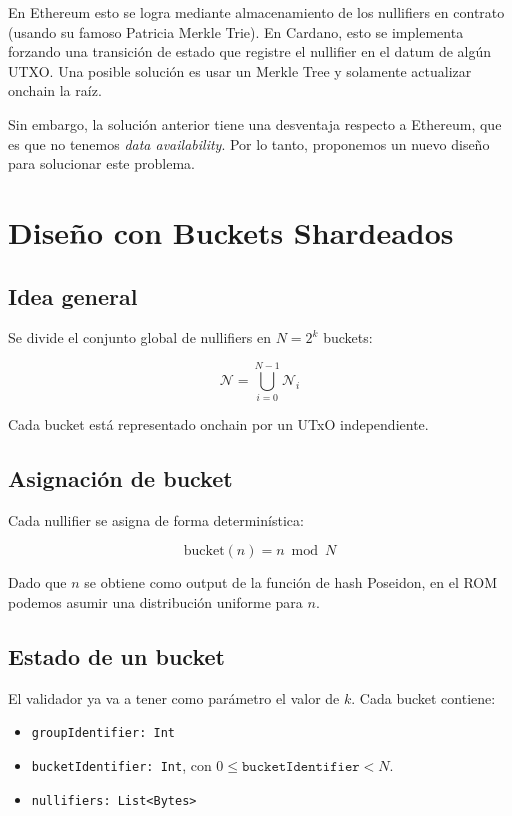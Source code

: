 \documentclass[11pt]{article}
\begin{document}
	En Ethereum esto se logra mediante almacenamiento de los nullifiers en contrato (usando su famoso Patricia Merkle Trie). En Cardano, esto se implementa forzando una transición de estado que registre el nullifier en el datum de algún UTXO. Una posible solución es usar un Merkle Tree y solamente actualizar onchain la raíz.
	
	Sin embargo, la solución anterior tiene una desventaja respecto a Ethereum, que es que no tenemos \textit{data availability}. Por lo tanto, proponemos un nuevo diseño para solucionar este problema.
	
	\section{Diseño con Buckets Shardeados}
	
	\subsection{Idea general}
	
	Se divide el conjunto global de nullifiers en $N = 2^k$ buckets:
	
	$$\mathcal{N} = \bigcup_{i=0}^{N-1} \mathcal{N}_i$$
	
	Cada bucket está representado onchain por un UTxO independiente.
	
	\subsection{Asignación de bucket}
	
	Cada nullifier se asigna de forma determinística:
	
	$$\text{bucket}(n) = n \bmod N$$
	
	Dado que $n$ se obtiene como output de la función de hash Poseidon, en el ROM podemos asumir una distribución uniforme para $n$.
	
	\subsection{Estado de un bucket}
	
	El validador ya va a tener como parámetro el valor de $k$. Cada bucket contiene:
	
	\begin{itemize}
		\item \texttt{groupIdentifier: Int}
		\item \texttt{bucketIdentifier: Int}, con $0 \leq \texttt{bucketIdentifier} < N$.
		\item \texttt{nullifiers: List<Bytes>}
	\end{itemize}
	
\end{document}
